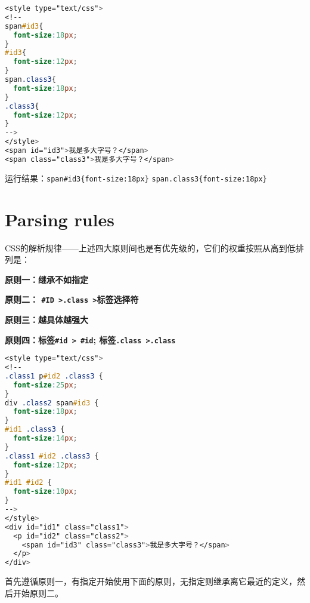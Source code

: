 \begin{lstlisting}[language=CSS]
<style type="text/css">
<!--
span#id3{ 
  font-size:18px; 
}
#id3{ 
  font-size:12px; 
}
span.class3{ 
  font-size:18px; 
}
.class3{ 
  font-size:12px; 
}
-->
</style>
<span id="id3">我是多大字号？</span>
<span class="class3">我是多大字号？</span>
\end{lstlisting}


运行结果：\verb|span#id3{font-size:18px}| \verb|span.class3{font-size:18px}|

\clearpage

\section{Parsing rules}


CSS的解析规律——上述四大原则间也是有优先级的，它们的权重按照从高到低排列是：

\begin{compactitem}
\item \textbf{原则一：继承不如指定}
\item \textbf{原则二： \texttt{\#ID >.class >}标签选择符}
\item \textbf{原则三：越具体越强大}
\item \textbf{原则四：标签\texttt{\#id > \#id}; 标签\texttt{.class >.class}}
\end{compactitem}

\begin{lstlisting}[language=CSS]
<style type="text/css">
<!--
.class1 p#id2 .class3 { 
  font-size:25px; 
}
div .class2 span#id3 { 
  font-size:18px; 
}
#id1 .class3 { 
  font-size:14px; 
}
.class1 #id2 .class3 { 
  font-size:12px; 
}
#id1 #id2 { 
  font-size:10px; 
}
-->
</style>
<div id="id1" class="class1">
  <p id="id2" class="class2">
    <span id="id3" class="class3">我是多大字号？</span>
  </p>
</div>
\end{lstlisting}


首先遵循原则一，有指定开始使用下面的原则，无指定则继承离它最近的定义，然后开始原则二。


